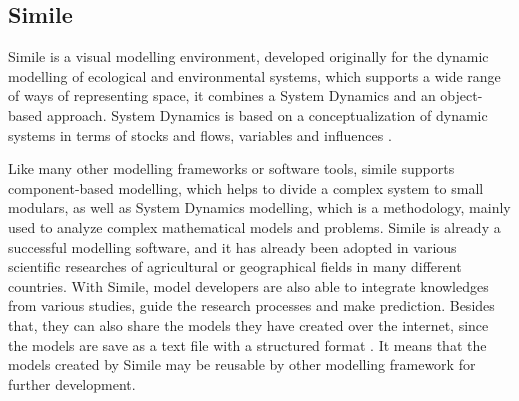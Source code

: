 \subsection{Simile}\label{sec:similie}
\par
Simile is a visual modelling environment, developed originally for the dynamic modelling of ecological and environmental systems, which supports a wide range of ways of representing space, it combines a System Dynamics and an object-based approach. System Dynamics is based on a conceptualization of dynamic systems in terms of stocks and flows, variables and influences \autocite{dsl:simile-simulistics}.
\par
Like many other modelling frameworks or software tools, simile supports component-based modelling, which helps to divide a complex system to small modulars, as well as System Dynamics modelling, which is a methodology, mainly used to analyze complex mathematical models and problems. Simile is already a successful modelling software, and it has already been adopted in various scientific researches of agricultural or geographical fields in many different countries. With Simile, model developers are also able to integrate knowledges from various studies, guide the research processes and make prediction. Besides that, they can also share the models they have created over the internet, since the models are save as a text file with a structured format \autocite{dsl:simile-muetzelfeldt}. It means that the models created by Simile may be reusable by other modelling framework for further development.
